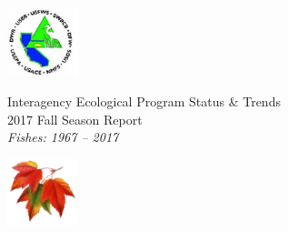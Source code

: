\documentclass[]{article}\usepackage[]{graphicx}\usepackage[]{color}
\begin{document}
\begin{Row}
  \begin{Cell}{1}
    \begin{center}
      \includegraphics[align=m,height=2cm]{figures/IEP_logo.PNG}
    \end{center}
  \end{Cell}
  \begin{Cell}{6}
    \begin{center}
      \vspace{-0.8cm}		%
      \doublespacing
      {\Large Interagency Ecological Program Status \& Trends } \\
      \vspace{0.2cm}
      {\Huge 2017 Fall Season Report} \\
      {\Large \emph{Fishes: 1967 -- 2017}}
    \end{center}
  \end{Cell}
  \begin{Cell}{1}
    \begin{center}
      \includegraphics[align=m,height=1.9cm]{figures/fall_logo.PNG}
    \end{center}
  \end{Cell}
  \begin{Cell}{4}
  \end{Cell}
\end{Row}
\end{document}
